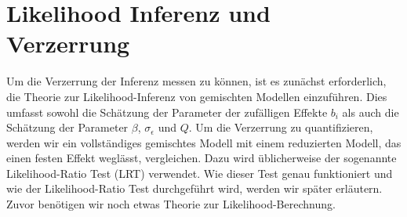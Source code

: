 \documentclass[%
thesis=student,%
coverpage=false,%
titlepage=false,%
headmarks=true, %
german,%
font=libertine, %
math=newpxtx, %
BCOR=5mm,%
coverBCOR=11mm%
]{tumbook}
\theoremstyle{break}
\begin{document}

\section{Likelihood Inferenz und Verzerrung}
Um die Verzerrung der Inferenz messen zu können, ist es zunächst erforderlich, die Theorie zur Likelihood-Inferenz von gemischten Modellen einzuführen. Dies umfasst sowohl die Schätzung der Parameter der zufälligen Effekte $b_i$ als auch die Schätzung der Parameter $\beta$, $\sigma_\epsilon$ und $Q$. Um die Verzerrung zu quantifizieren, werden wir ein vollständiges gemischtes Modell mit einem reduzierten Modell, das einen festen Effekt weglässt, vergleichen. Dazu wird üblicherweise der sogenannte Likelihood-Ratio Test (LRT) verwendet.
Wie dieser Test genau funktioniert und wie der Likelihood-Ratio Test durchgeführt wird, werden wir später erläutern. Zuvor benötigen wir noch etwas Theorie zur Likelihood-Berechnung.
\end{document}
